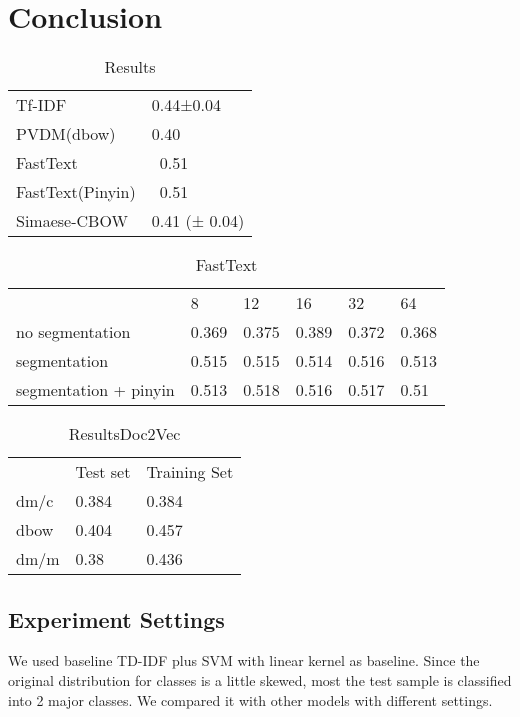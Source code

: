 \chapter{Conclusion}

\begin{table}[]
\centering
\caption{Results}
\label{resultAll}
\begin{tabular}{ll}
Tf-IDF   & 0.44±0.04 \\
PVDM(dbow) & 0.40    \\
FastText &  ~0.51   \\
FastText(Pinyin) &  ~0.51  \\
Simaese-CBOW & 0.41 (± 0.04)
\end{tabular}
\end{table}

\begin{table}[]
\centering
\caption{FastText}
\label{fasttext}
\begin{tabular}{llllll}
   & 8 & 12 & 16 & 32 & 64 \\
no segmentation  & 0.369 & 0.375 & 0.389 & 0.372 & 0.368 \\
segmentation  & 0.515 & 0.515 & 0.514 & 0.516 & 0.513 \\
segmentation + pinyin  & 0.513 & 0.518 & 0.516 & 0.517 & 0.51 \\
\end{tabular}
\end{table}

\begin{table}[]
\centering
\caption{ResultsDoc2Vec}
\label{resultAll}
\begin{tabular}{lll}
      & Test set & Training Set \\
dm/c  & 0.384 &  0.384 \\
dbow &  0.404  & 0.457 \\
dm/m &  0.38  & 0.436
\end{tabular}
\end{table}


\section{Experiment Settings}


We used baseline TD-IDF plus SVM with linear kernel as baseline. Since the original distribution for classes is a little skewed, most the test sample is classified into 2 major classes.
We compared it with other models with different settings. \\

